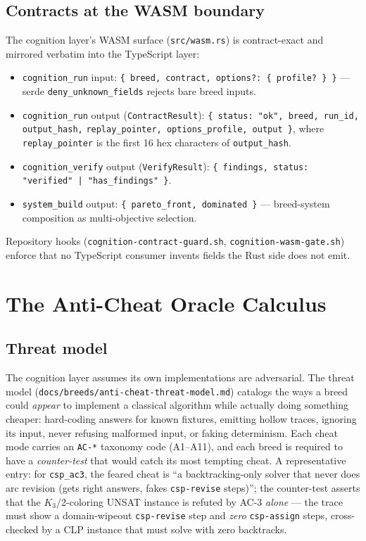 \documentclass[11pt,oneside]{report}
\begin{document}
\section{Contracts at the WASM boundary}

The cognition layer's WASM surface (\texttt{src/wasm.rs}) is contract-exact
and mirrored verbatim into the TypeScript layer:

\begin{itemize}
  \item \texttt{cognition\_run} input:
  \verb|{ breed, contract, options?: { profile? } }| ---
  serde \texttt{deny\_unknown\_fields} rejects bare breed inputs.
  \item \texttt{cognition\_run} output (\texttt{ContractResult}):
  \verb|{ status: "ok", breed, run_id, output_hash,|
  \verb|replay_pointer, options_profile, output }|, where
  \texttt{replay\_pointer} is the first 16 hex characters of
  \texttt{output\_hash}.
  \item \texttt{cognition\_verify} output (\texttt{VerifyResult}):
  \verb+{ findings, status: "verified" | "has_findings" }+.
  \item \texttt{system\_build} output:
  \verb|{ pareto_front, dominated }| --- breed-system composition as
  multi-objective selection.
\end{itemize}

Repository hooks (\texttt{cognition-contract-guard.sh},
\texttt{cognition-wasm-gate.sh}) enforce that no TypeScript consumer
invents fields the Rust side does not emit.

\chapter{The Anti-Cheat Oracle Calculus}
\label{ch:anticheat}

\section{Threat model}

The cognition layer assumes its own implementations are adversarial. The
threat model (\texttt{docs/breeds/anti-cheat-threat-model.md}) catalogs the
ways a breed could \emph{appear} to implement a classical algorithm while
actually doing something cheaper: hard-coding answers for known fixtures,
emitting hollow traces, ignoring its input, never refusing malformed input,
or faking determinism. Each cheat mode carries an \texttt{AC-*} taxonomy
code (A1--A11), and each breed is required to have a \emph{counter-test}
that would catch its most tempting cheat. A representative entry: for
\texttt{csp\_ac3}, the feared cheat is ``a backtracking-only solver that
never does arc revision (gets right answers, fakes \texttt{csp-revise}
steps)''; the counter-test asserts that the $K_3$/2-coloring UNSAT
instance is refuted by AC-3 \emph{alone} --- the trace must show a
domain-wipeout \texttt{csp-revise} step and \emph{zero} \texttt{csp-assign}
steps, cross-checked by a CLP instance that must solve with zero
backtracks.
\end{document}
